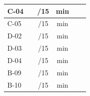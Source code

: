 \begin{center}
\begin{tabular}{|l|c|c|c|c|c|}
\hline
C-04 & \underline{\hspace{1.5cm}} & \underline{\hspace{1cm}}/15 & \underline{\hspace{1cm}}min & \underline{\hspace{1cm}} & \underline{\hspace{2cm}} \\
\hline
C-05 & \underline{\hspace{1.5cm}} & \underline{\hspace{1cm}}/15 & \underline{\hspace{1cm}}min & \underline{\hspace{1cm}} & \underline{\hspace{2cm}} \\
\hline
D-02 & \underline{\hspace{1.5cm}} & \underline{\hspace{1cm}}/15 & \underline{\hspace{1cm}}min & \underline{\hspace{1cm}} & \underline{\hspace{2cm}} \\
\hline
D-03 & \underline{\hspace{1.5cm}} & \underline{\hspace{1cm}}/15 & \underline{\hspace{1cm}}min & \underline{\hspace{1cm}} & \underline{\hspace{2cm}} \\
\hline
D-04 & \underline{\hspace{1.5cm}} & \underline{\hspace{1cm}}/15 & \underline{\hspace{1cm}}min & \underline{\hspace{1cm}} & \underline{\hspace{2cm}} \\
\hline
B-09 & \underline{\hspace{1.5cm}} & \underline{\hspace{1cm}}/15 & \underline{\hspace{1cm}}min & \underline{\hspace{1cm}} & \underline{\hspace{2cm}} \\
\hline
B-10 & \underline{\hspace{1.5cm}} & \underline{\hspace{1cm}}/15 & \underline{\hspace{1cm}}min & \underline{\hspace{1cm}} & \underline{\hspace{2cm}} \\

\end{tabular}
\end{center}
